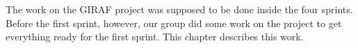 The work on the GIRAF project was supposed to be done inside the four sprints. Before the first sprint, however, our group did some work on the project to get everything ready for the first sprint. This chapter describes this work.